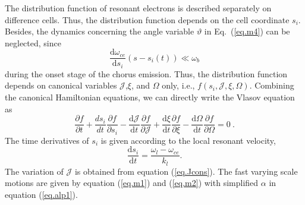 The distribution function of resonant electrons is described separately on difference cells.
Thus, the distribution function depends on the cell coordinate $s_i$.
Besides, the dynamics concerning the angle variable $\vartheta$ in Eq.~(\ref{eq.m4}) can be neglected, since
\begin{equation}
   \frac{\mathrm{d} \omega_{ce}}{\mathrm{d} s_{i}}\left(s-s_{i}(t)\right) \ll \omega_b
\end{equation}
during the onset stage of the chorus emission.
Thus, the distribution function depends on canonical variables $\mathcal{J}$,$\xi$, and $\Omega$ only, i.e., $f(s_i,\mathcal{J},\xi,\Omega)$.
Combining the canonical Hamiltonian equations, we can directly write the Vlasov equation as 
\begin{equation}\label{eq.vlasov}
    \frac{\partial f}{\partial t}+ \frac{d s_{i}}{d t} \frac{\partial f}{\partial s_{i}} - \frac{\mathrm{d} \mathcal{J}}{\mathrm{d}t} \frac{\partial f}{\partial \mathcal{J}} + \frac{\mathrm{d}\xi}{\mathrm{d} t} \frac{\partial f}{\partial \xi} - \frac{\mathrm{d}\Omega}{\mathrm{d} t} \frac{\partial f}{\partial \Omega}=0~.
\end{equation}
The time derivatives of $s_i$ is given according to the local resonant velocity,
\begin{equation}
    \frac{\mathrm{d}s_i}{\mathrm{d}t} = \frac{\omega_l- \omega_{ce}}{k_l}.
\end{equation}
The variation of $\mathcal{J}$ is obtained from equation (\ref{eq.Jcons}).
The fast varying scale motions are given by equation (\ref{eq.m1}) and (\ref{eq.m2}) with simplified $\alpha$ in equation (\ref{eq.alp1}).


